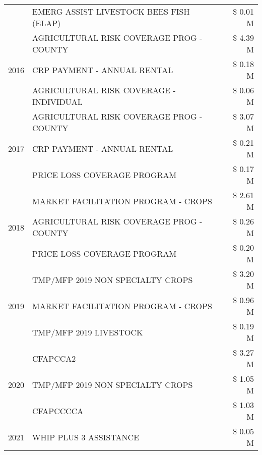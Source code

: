 \begin{tabular}{llr}
 & EMERG ASSIST LIVESTOCK BEES FISH (ELAP) & \$ 0.01 M \\
\cline{1-3}
\multirow[t]{3}{*}{2016} & AGRICULTURAL RISK COVERAGE PROG - COUNTY      & \$ 4.39 M \\
 & CRP PAYMENT - ANNUAL RENTAL                   & \$ 0.18 M \\
 & AGRICULTURAL RISK COVERAGE - INDIVIDUAL       & \$ 0.06 M \\
\cline{1-3}
\multirow[t]{3}{*}{2017} & AGRICULTURAL RISK COVERAGE PROG - COUNTY & \$ 3.07 M \\
 & CRP PAYMENT - ANNUAL RENTAL & \$ 0.21 M \\
 & PRICE LOSS COVERAGE PROGRAM & \$ 0.17 M \\
\cline{1-3}
\multirow[t]{3}{*}{2018} & MARKET FACILITATION PROGRAM - CROPS & \$ 2.61 M \\
 & AGRICULTURAL RISK COVERAGE PROG - COUNTY & \$ 0.26 M \\
 & PRICE LOSS COVERAGE PROGRAM & \$ 0.20 M \\
\cline{1-3}
\multirow[t]{3}{*}{2019} & TMP/MFP 2019 NON SPECIALTY CROPS & \$ 3.20 M \\
 & MARKET FACILITATION PROGRAM - CROPS & \$ 0.96 M \\
 & TMP/MFP 2019 LIVESTOCK & \$ 0.19 M \\
\cline{1-3}
\multirow[t]{3}{*}{2020} & CFAPCCA2 & \$ 3.27 M \\
 & TMP/MFP 2019 NON SPECIALTY CROPS & \$ 1.05 M \\
 & CFAPCCCCA & \$ 1.03 M \\
\cline{1-3}
2021 & WHIP PLUS 3 ASSISTANCE & \$ 0.05 M \\
\cline{1-3}
\bottomrule
\end{tabular}
